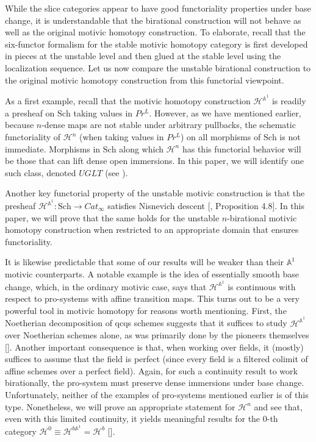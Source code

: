 While the slice categories appear to have good functoriality properties under base change, it is understandable that the birational construction will not behave as well as the original motivic homotopy construction. To elaborate, recall that the six-functor formalism for the stable motivic homotopy category is first developed in pieces at the unstable level and then glued at the stable level using the localization sequence. Let us now compare the unstable birational construction to the original motivic homotopy construction from this functorial viewpoint.


As a first example, recall that the motivic homotopy construction $\mathcal{H}^{\mathbb{A}^1}$ is readily a presheaf on $\mathrm{Sch}$ taking values in $Pr^L$. However, as we have mentioned earlier, because $n$-dense maps are not stable under arbitrary pullbacks, the schematic functoriality of $\mathcal{H}^{n}$ (when taking values in $Pr^L$) on all morphisms of $\mathrm{Sch}$ is not immediate. Morphisms in $\mathrm{Sch}$ along which $\mathcal{H}^n$ has this functorial behavior will be those that can lift dense open immersions. In this paper, we will identify one such class, denoted $UGLT$ (see ).

Another key functorial property of the unstable motivic construction is that the presheaf $\mathcal{H}^{\mathbb{A}^1}: \mathrm{Sch}\to Cat_\infty$ satisfies Nisnevich descent [\cite{hoyois2017six}, Proposition 4.8]. In this paper, we will prove that the same holds for the unstable $n$-birational motivic homotopy construction when restricted to an appropriate domain that ensures functoriality.

It is likewise predictable that some of our results will be weaker than their $\mathbb{A}^1$ motivic counterparts. A notable example is the idea of essentially smooth base change, which, in the ordinary motivic case, says that $\mathcal{H}^{\mathbb{A}^1}$ is continuous with respect to pro-systems with affine transition maps. This turns out to be a very powerful tool in motivic homotopy for reasons worth mentioning. First, the Noetherian decomposition of qcqs schemes suggests that it suffices to study $\mathcal{H}^{\mathbb{A}^1}$ over Noetherian schemes alone, as was primarily done by the pioneers themselves [\cite{morel19991}]. Another important consequence is that, when working over fields, it (mostly) suffices to assume that the field is perfect (since every field is a filtered colimit of affine schemes over a perfect field). Again, for such a continuity result to work birationally, the pro-system must preserve dense immersions under base change. Unfortunately, neither of the examples of pro-systems mentioned earlier is of this type. Nonetheless, we will prove an appropriate statement for $\mathcal{H}^n$ and see that, even with this limited continuity, it yields meaningful results for the $0$-th category $\mathcal{H}^0\equiv\mathcal{H}^{b\mathbb{A}^1}= \mathcal{H}^b$ [\cite{0bat}].

